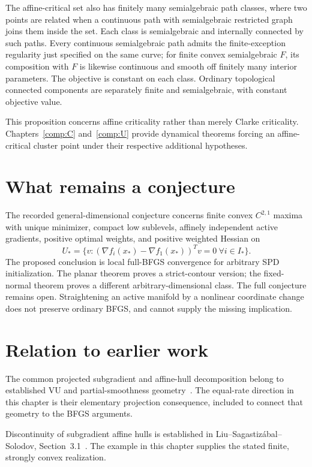 The affine-critical set also has finitely many semialgebraic path classes, where two points are related when a continuous path with semialgebraic restricted graph joins them inside the set. Each class is semialgebraic and internally connected by such paths. Every continuous semialgebraic path admits the finite-exception regularity just specified on the same curve; for finite convex semialgebraic $F$, its composition with $F$ is likewise continuous and smooth off finitely many interior parameters. The objective is constant on each class. Ordinary topological connected components are separately finite and semialgebraic, with constant objective value.

This proposition concerns affine criticality rather than merely Clarke criticality. Chapters~\ref{comp:C} and~\ref{comp:U} provide dynamical theorems forcing an affine-critical cluster point under their respective additional hypotheses.



\section{What remains a conjecture}
The recorded general-dimensional conjecture concerns finite convex $C^{2,1}$ maxima with unique minimizer, compact low sublevels, affinely independent active gradients, positive optimal weights, and positive weighted Hessian on
\[
 U_* =\{v:(\nabla f_i(x_*)-\nabla f_1(x_*))^Tv=0\ \forall i\in I_*\}.
\]
The proposed conclusion is local full-BFGS convergence for arbitrary SPD initialization. The planar theorem proves a strict-contour version; the fixed-normal theorem proves a different arbitrary-dimensional class. The full conjecture remains open. Straightening an active manifold by a nonlinear coordinate change does not preserve ordinary BFGS, and cannot supply the missing implication.


\section*{Relation to earlier work}
The common projected subgradient and affine-hull decomposition belong to established VU and partial-smoothness geometry~\cite{geom_Lewis2002,LL}. The equal-rate direction in this chapter is their elementary projection consequence, included to connect that geometry to the BFGS arguments.

Discontinuity of subgradient affine hulls is established in Liu--Sagastiz\'abal--Solodov, Section~3.1~\cite{geom_LSS2019}. The example in this chapter supplies the stated finite, strongly convex realization.

